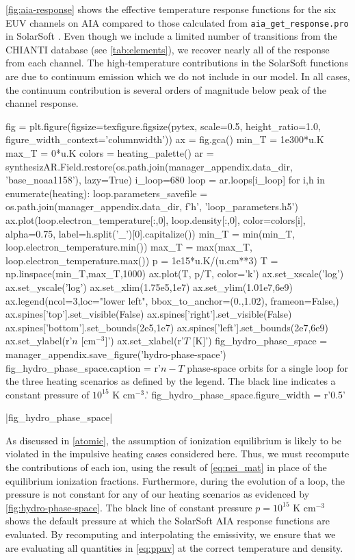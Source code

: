 \autoref{fig:aia-response} shows the effective temperature response functions for the six EUV channels on AIA compared to those calculated from \texttt{aia\_get\_response.pro} in SolarSoft \citep{freeland_data_1998}. Even though we include a limited number of transitions from the CHIANTI database (see \autoref{tab:elements}), we recover nearly all of the response from each channel. The high-temperature contributions in the SolarSoft functions are due to continuum emission which we do not include in our model. In all cases, the continuum contribution is several orders of magnitude below peak of the channel response.

\begin{pycode}
fig = plt.figure(figsize=texfigure.figsize(pytex, scale=0.5, height_ratio=1.0, 
                                           figure_width_context='columnwidth'))
ax = fig.gca()
min_T = 1e300*u.K
max_T = 0*u.K
colors = heating_palette()
ar = synthesizAR.Field.restore(os.path.join(manager_appendix.data_dir, 'base_noaa1158'), lazy=True)
i_loop=680
loop = ar.loops[i_loop]
for i,h in enumerate(heating):
    loop.parameters_savefile = os.path.join(manager_appendix.data_dir, f'{h}', 'loop_parameters.h5')
    ax.plot(loop.electron_temperature[:,0], loop.density[:,0], color=colors[i], alpha=0.75,
            label=h.split('_')[0].capitalize())
    min_T = min(min_T, loop.electron_temperature.min())
    max_T = max(max_T, loop.electron_temperature.max())
p = 1e15*u.K/(u.cm**3)
T = np.linspace(min_T,max_T,1000)
ax.plot(T, p/T, color='k')
ax.set_xscale('log')
ax.set_yscale('log')
ax.set_xlim(1.75e5,1e7)
ax.set_ylim(1.01e7,6e9)
ax.legend(ncol=3,loc="lower left", bbox_to_anchor=(0.,1.02), frameon=False,)
ax.spines['top'].set_visible(False)
ax.spines['right'].set_visible(False)
ax.spines['bottom'].set_bounds(2e5,1e7)
ax.spines['left'].set_bounds(2e7,6e9)
ax.set_ylabel(r'$n$ [cm$^{-3}$]')
ax.set_xlabel(r'$T$ [K]')
fig_hydro_phase_space = manager_appendix.save_figure('hydro-phase-space')
fig_hydro_phase_space.caption = r'$n-T$ phase-space orbits for a single loop for the three heating scenarios as defined by the legend. The black line indicates a constant pressure of $10^{15}$ K cm$^{-3}$.'
fig_hydro_phase_space.figure_width = r'0.5\columnwidth'
\end{pycode}
|fig_hydro_phase_space|

As discussed in \autoref{atomic}, the assumption of ionization equilibrium is likely to be violated in the impulsive heating cases considered here. Thus, we must recompute the contributions of each ion, using the result of \autoref{eq:nei_mat} in place of the equilibrium ionization fractions. Furthermore, during the evolution of a loop, the pressure is not constant for any of our heating scenarios as evidenced by \autoref{fig:hydro-phase-space}. The black line of constant pressure $p=10^{15}$ K cm$^{-3}$ shows the default pressure at which the SolarSoft AIA response functions are evaluated. By recomputing and interpolating the emissivity, we ensure that we are evaluating all quantities in \autoref{eq:ppuv} at the correct temperature and density.

